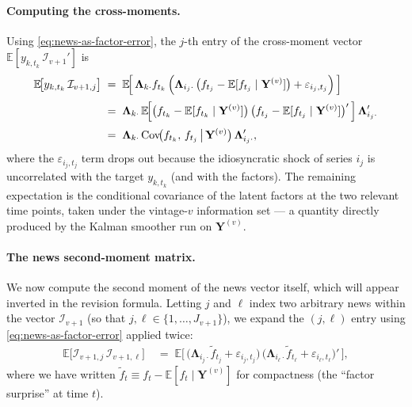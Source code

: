 \documentclass[11pt, a4paper, oneside]{article}
\begin{document}
\paragraph{Computing the cross-moments.}
Using \eqref{eq:news-as-factor-error}, the $j$-th entry of the
cross-moment vector $\mathbb{E}[y_{k, t_k}\, \mathcal{I}_{v+1}']$ is
\begin{align}
\mathbb{E}\!\big[y_{k, t_k}\, \mathcal{I}_{v+1, j}\big] \;&=\;
\mathbb{E}\!\Big[\,\boldsymbol{\Lambda}_{k \cdot} f_{t_k}\, \Big(\boldsymbol{\Lambda}_{i_j \cdot}\, \big(f_{t_j} - \mathbb{E}[f_{t_j} \mid \mathbf{Y}^{(v)}]\big) + \varepsilon_{i_j, t_j}\Big)\,\Big] \notag \\[2pt]
\;&=\; \boldsymbol{\Lambda}_{k \cdot} \,
\mathbb{E}\!\Big[\big(f_{t_k} - \mathbb{E}[f_{t_k} \mid \mathbf{Y}^{(v)}]\big)\, \big(f_{t_j} - \mathbb{E}[f_{t_j} \mid \mathbf{Y}^{(v)}]\big)'\,\Big] \,
\boldsymbol{\Lambda}_{i_j \cdot}' \notag \\[2pt]
\;&=\; \boldsymbol{\Lambda}_{k \cdot} \,
\mathrm{Cov}\!\big(f_{t_k},\, f_{t_j} \,\big|\, \mathbf{Y}^{(v)}\big) \,
\boldsymbol{\Lambda}_{i_j \cdot}',
\label{eq:cross-moment-y-news}
\end{align}
where the $\varepsilon_{i_j, t_j}$ term drops out because the
idiosyncratic shock of series $i_j$ is uncorrelated with the target
$y_{k, t_k}$ (and with the factors). The remaining expectation is
the conditional covariance of the latent factors at the two
relevant time points, taken under the vintage-$v$ information set —
a quantity directly produced by the Kalman smoother run on
$\mathbf{Y}^{(v)}$.

\paragraph{The news second-moment matrix.}
We now compute the second moment of the news vector itself, which
will appear inverted in the revision formula. Letting $j$ and $\ell$
index two arbitrary news within the vector $\mathcal{I}_{v+1}$ (so
that $j, \ell \in \{1, \ldots, J_{v+1}\}$), we expand the $(j, \ell)$
entry using \eqref{eq:news-as-factor-error} applied twice:
\begin{align*}
\mathbb{E}\!\big[\mathcal{I}_{v+1, j}\, \mathcal{I}_{v+1, \ell}\big]
\;&=\; \mathbb{E}\!\Big[\,\big(\boldsymbol{\Lambda}_{i_j \cdot} \widetilde{f}_{t_j} + \varepsilon_{i_j, t_j}\big)\, \big(\boldsymbol{\Lambda}_{i_\ell \cdot} \widetilde{f}_{t_\ell} + \varepsilon_{i_\ell, t_\ell}\big)'\,\Big],
\end{align*}
where we have written
$\widetilde{f}_{t} \equiv f_{t} - \mathbb{E}[f_{t} \mid \mathbf{Y}^{(v)}]$
for compactness (the ``factor surprise'' at time $t$).
\end{document}
